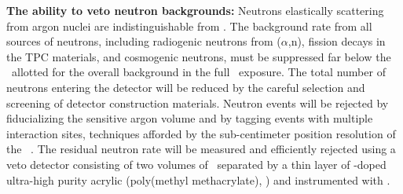 \begin{asparaenum}

\item[\bf The ability to veto neutron backgrounds:]
Neutrons elastically scattering from argon nuclei are indistinguishable from \WIMPs. The background rate from all sources of neutrons, including radiogenic neutrons from ($\alpha$,n), fission decays in the TPC materials, and cosmogenic neutrons, must be suppressed far below the \BackgroundFreeRequirement\ allotted for the overall background in the full \DSkExtendedExposure\ exposure. The total number of neutrons entering the detector will be reduced by the careful selection and screening of detector construction materials. Neutron events will be rejected by fiducializing the sensitive argon volume and by tagging events with multiple interaction sites, techniques afforded by the sub-centimeter position resolution of the \LArTPC~\cite{Agnes:2015gu}.  The residual neutron rate will be measured and efficiently rejected using a veto detector consisting of two volumes of \AAr\ separated by a thin layer of -doped ultra-high purity acrylic (poly(methyl methacrylate), \PMMA) and instrumented with \DSkPdms.



\end{asparaenum}
